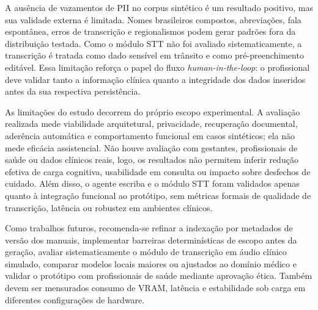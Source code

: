 A ausência de vazamentos de PII no corpus sintético é um resultado positivo, mas sua validade externa é limitada. Nomes brasileiros compostos, abreviações, fala espontânea, erros de transcrição e regionalismos podem gerar padrões fora da distribuição testada.
Como o módulo STT não foi avaliado sistematicamente, a transcrição é tratada como dado sensível em trânsito e como \linebreak pré-preenchimento editável.
Essa limitação reforça o papel do fluxo \textit{human-in-the-loop}: o profissional deve validar tanto a informação clínica quanto a integridade dos dados inseridos antes da sua respectiva persistência.

As limitações do estudo decorrem do próprio escopo experimental.
A avaliação realizada mede viabilidade arquitetural, privacidade, recuperação documental, aderência automática e comportamento funcional em casos sintéticos; ela não mede eficácia assistencial. Não houve avaliação com gestantes, profissionais de saúde ou dados clínicos reais, logo, os resultados não permitem inferir redução efetiva de carga cognitiva, usabilidade em consulta ou impacto sobre desfechos de cuidado.
Além disso, o agente escriba e o módulo STT foram validados apenas quanto à integração funcional ao protótipo, sem métricas formais de qualidade de transcrição, latência ou robustez em ambientes clínicos.

Como trabalhos futuros, recomenda-se refinar a indexação por metadados de versão dos manuais, implementar barreiras determinísticas de escopo antes da geração, avaliar sistematicamente o módulo de transcrição em áudio clínico simulado, comparar modelos locais maiores ou ajustados ao domínio médico e validar o protótipo com profissionais de saúde mediante aprovação ética.
Também devem ser mensurados consumo de VRAM, latência e estabilidade sob carga em diferentes configurações de hardware.
